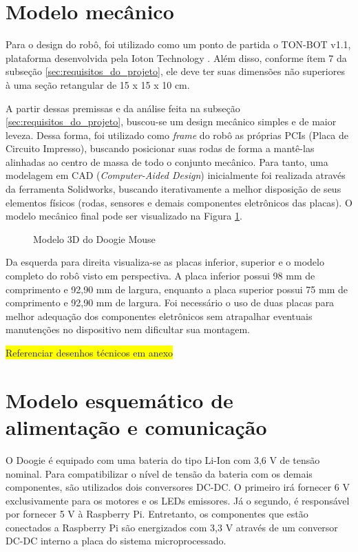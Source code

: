 \section{Modelo mecânico}
\label{sec:modelo_mecanico}
Para o design do robô, foi utilizado como um ponto de partida o TON-BOT v1.1, plataforma desenvolvida pela Ioton Technology \cite{teste}. Além disso, conforme ítem 7 da subseção \ref{sec:requisitos_do_projeto}, ele deve ter suas dimensões não superiores à uma seção retangular de 15 x 15 x 10 cm.

A partir dessas premissas e da análise feita na subseção \ref{sec:requisitos_do_projeto}, buscou-se um design mecânico simples e de maior leveza. Dessa forma, foi utilizado como \textit{frame} do robô as próprias PCIs (Placa de Circuito Impresso), buscando posicionar suas rodas de forma a mantê-las alinhadas ao centro de massa de todo o conjunto mecânico. Para tanto, uma modelagem em CAD (\textit{Computer-Aided Design}) inicialmente foi realizada através da ferramenta Solidworks, buscando iterativamente a melhor disposição de seus elementos físicos (rodas, sensores e demais componentes eletrônicos das placas).  O modelo mecânico final pode ser visualizado na Figura \ref{fig:doogie_boards_3d}.

\begin{figure}[H]
	\centering
	\caption{Modelo 3D do Doogie Mouse}
	\label{fig:doogie_boards_3d}
\end{figure}

Da esquerda para direita visualiza-se as placas inferior, superior e o modelo completo do robô visto em perspectiva. A placa inferior possui 98 mm de comprimento e 92,90 mm de largura, enquanto a placa superior possui 75 mm de comprimento e 92,90 mm de largura. Foi necessário o uso de duas placas para melhor adequação dos componentes eletrônicos sem atrapalhar eventuais manutenções no dispositivo nem dificultar sua montagem.

\colorbox{yellow}{Referenciar desenhos técnicos em anexo}

\section{Modelo esquemático de alimentação e comunicação}
\label{sec:arquitetura_eletrica_geral}
O Doogie é equipado com uma bateria do tipo Li-Ion com 3,6 V de tensão nominal. Para compatibilizar o nível de tensão da bateria com os demais componentes, são utilizados dois conversores DC-DC. O primeiro irá fornecer 6 V exclusivamente para os motores e os LEDs emissores. Já o segundo, é responsável por fornecer 5 V à Raspberry Pi. Entretanto, os componentes que estão conectados a Raspberry Pi são energizados com 3,3 V através de um conversor DC-DC interno a placa do sistema microprocessado.

